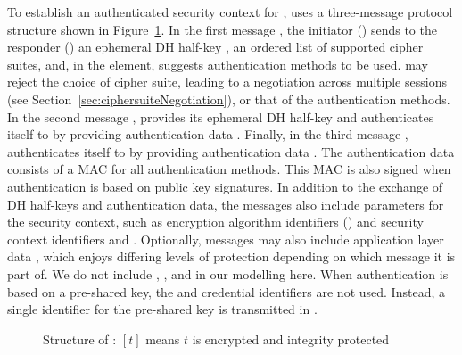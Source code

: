 
To establish an authenticated security context for \mOscore,
\mEdhoc{} uses a three-message protocol structure
shown in Figure~\ref{fig:edhocFramework}.
%
In the first message \mMsgone{}, the initiator () sends to the responder () an
ephemeral DH half-key \mGx{}, an ordered list of supported cipher suites, and, in the \mMethod{} element, suggests
authentication methods to be used.
%
 may reject the choice of cipher suite, leading to a negotiation across multiple \mEdhoc{} sessions (see Section~\ref{sec:ciphersuiteNegotiation}), or that of the authentication methods.
%
In the second message \mMsgtwo{},  provides its ephemeral
DH half-key \mGy{} and authenticates itself to  by
providing authentication data \mAuthr{}.
%
Finally, in the third message \mMsgthree{},  authenticates itself
to  by providing authentication data \mAuthi{}.
%
The authentication data consists of a MAC for all authentication methods.
%
This MAC is also signed when authentication is based on public key signatures.
%
In addition to the exchange of DH half-keys and authentication data, the
messages also include parameters for the \mOscore{} security context, such as
encryption algorithm identifiers (\mSuites{}) and \mOscore{} security context
identifiers \mCi{} and \mCr{}.
%
Optionally, messages may also include application layer data \mAD{}, which
enjoys differing levels of protection depending on which message it is part of.
%
We do not include \mCi, \mCr, and \mAD{} in our modelling here.
%
When authentication is based on
a pre-shared key, the \mCredi{} and \mCredr{} credential identifiers are not
used.
%
Instead, a single identifier for the pre-shared key is transmitted in \mMsgone{}.
%
\begin{figure}
\centering
\linespread{1}
\caption{Structure of \mEdhoc{}: $[t]$ means $t$ is encrypted and integrity protected}
\label{fig:edhocFramework}
\end{figure}

